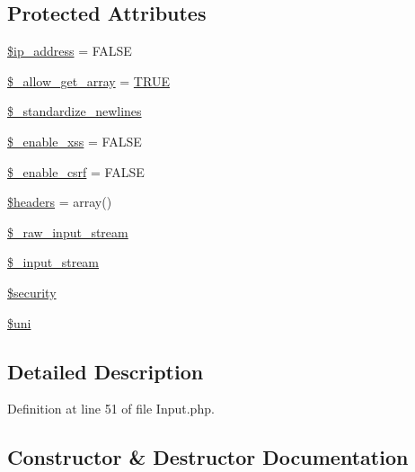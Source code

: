 \subsection*{Protected Attributes}
\begin{DoxyCompactItemize}
\item 
\mbox{\hyperlink{class_c_i___input_a614e10d1ab6dcf06fa7fef37af7b7eee}{\$ip\+\_\+address}} = F\+A\+L\+SE
\item 
\mbox{\hyperlink{class_c_i___input_a359b1debb6f1d80e345d6215af6946fb}{\$\+\_\+allow\+\_\+get\+\_\+array}} = \mbox{\hyperlink{constants_8php_ae04a3efe6aa42044f803ee90c2277846}{T\+R\+UE}}
\item 
\mbox{\hyperlink{class_c_i___input_ad9ebdfce8f992b3a41aaf64ea8782933}{\$\+\_\+standardize\+\_\+newlines}}
\item 
\mbox{\hyperlink{class_c_i___input_a42b707bea5d9604a7460e953d9e39d7d}{\$\+\_\+enable\+\_\+xss}} = F\+A\+L\+SE
\item 
\mbox{\hyperlink{class_c_i___input_a463c89c07e7cf7f5e4337a2a8e460d17}{\$\+\_\+enable\+\_\+csrf}} = F\+A\+L\+SE
\item 
\mbox{\hyperlink{class_c_i___input_a52500036ee807241b8b4b7e2367c49ef}{\$headers}} = array()
\item 
\mbox{\hyperlink{class_c_i___input_a6f70bcba6388b55275db11f519649441}{\$\+\_\+raw\+\_\+input\+\_\+stream}}
\item 
\mbox{\hyperlink{class_c_i___input_aa67cd17f9c04d6c58d10a80630e4faf2}{\$\+\_\+input\+\_\+stream}}
\item 
\mbox{\hyperlink{class_c_i___input_a7ef3408af92597c92305e22f79e67d61}{\$security}}
\item 
\mbox{\hyperlink{class_c_i___input_a6ed6e0f7f970550e288f83845eec6393}{\$uni}}
\end{DoxyCompactItemize}


\subsection{Detailed Description}


Definition at line 51 of file Input.\+php.



\subsection{Constructor \& Destructor Documentation}
\mbox{\label{class_c_i___input_a095c5d389db211932136b53f25f39685}} 
